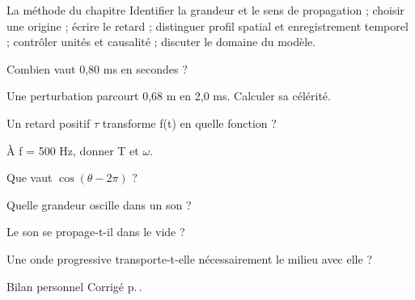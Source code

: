 \begin{methode}{La méthode du chapitre}
Identifier la grandeur et le sens de propagation ; choisir une origine ; écrire le retard ; distinguer profil spatial et enregistrement temporel ; contrôler unités et causalité ; discuter le domaine du modèle.
\end{methode}


\begin{questions}
\item Combien vaut 0,80 ms en secondes ?
\item Une perturbation parcourt 0,68 m en 2,0 ms. Calculer sa célérité.
\item Un retard positif \ensuremath{\tau} transforme f(t) en quelle fonction ?
\item À f = 500 Hz, donner T et \ensuremath{\omega}.
\item Que vaut $\cos(\theta-2\pi)$ ?
\item Quelle grandeur oscille dans un son ?
\item Le son se propage-t-il dans le vide ?
\item Une onde progressive transporte-t-elle nécessairement le milieu avec elle ?
\end{questions}
\begin{docu}{Bilan personnel}
Corrigé p.\,\pageref{corr-diag}.
\end{docu}


